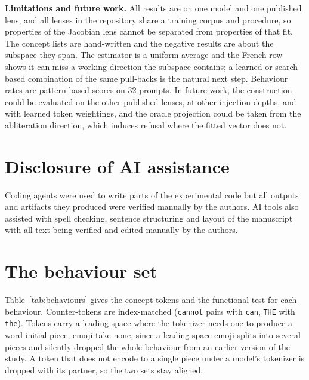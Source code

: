 \documentclass{article}
\begin{document}
\textbf{Limitations and future work.} All results are on one model and one published lens, and all lenses in the repository share a training corpus and procedure, so properties of the Jacobian lens cannot be separated from properties of that fit. The concept lists are hand-written and the negative results are about the subspace they span. The estimator is a uniform average and the French row shows it can miss a working direction the subspace contains; a learned or search-based combination of the same pull-backs is the natural next step. Behaviour rates are pattern-based scores on 32 prompts. In future work, the construction could be evaluated on the other published lenses, at other injection depths, and with learned token weightings, and the oracle projection could be taken from the abliteration direction, which induces refusal where the fitted vector does not.

\section*{Disclosure of AI assistance}

Coding agents were used to write parts of the experimental code but all outputs and artifacts they produced were verified manually by the authors. AI tools also assisted with spell checking, sentence structuring and layout of the manuscript with all text being verified and edited manually by the authors.




\appendix

\section{The behaviour set}
\label{app:behaviours}

Table~\ref{tab:behaviours} gives the concept tokens and the functional test for each behaviour. Counter-tokens are index-matched (\texttt{cannot} pairs with \texttt{can}, \texttt{THE} with \texttt{the}). Tokens carry a leading space where the tokenizer needs one to produce a word-initial piece; emoji take none, since a leading-space emoji splits into several pieces and silently dropped the whole behaviour from an earlier version of the study. A token that does not encode to a single piece under a model's tokenizer is dropped with its partner, so the two sets stay aligned.
\end{document}
